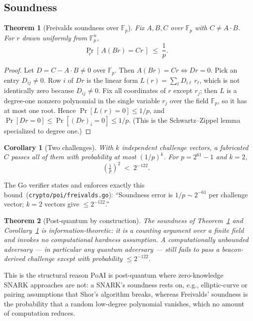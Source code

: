 \documentclass[11pt,a4paper]{article}
\newtheorem{theorem}{Theorem}
\newtheorem{corollary}{Corollary}
\begin{document}
\subsection{Soundness}

\begin{theorem}[Freivalds soundness over $\mathbb{F}_p$]\label{thm:freivalds}
Fix $A, B, C$ over $\mathbb{F}_p$ with $C \neq A \cdot B$. For $r$ drawn uniformly from $\mathbb{F}_p^{n}$,
\[
  \Pr_r\!\left[\, A(Br) = Cr \,\right] \;\le\; \frac{1}{p}.
\]
\end{theorem}

\begin{proof}
Let $D = C - A\cdot B \neq 0$ over $\mathbb{F}_p$. Then $A(Br) = Cr \iff Dr = 0$. Pick an entry $D_{i j} \neq 0$. Row $i$ of $Dr$ is the linear form $L(r) = \sum_{\ell} D_{i\ell}\, r_\ell$, which is not identically zero because $D_{i j} \neq 0$. Fix all coordinates of $r$ except $r_j$; then $L$ is a degree-one nonzero polynomial in the single variable $r_j$ over the field $\mathbb{F}_p$, so it has at most one root. Hence $\Pr[L(r) = 0] \le 1/p$, and $\Pr[Dr = 0] \le \Pr[(Dr)_i = 0] \le 1/p$. (This is the Schwartz--Zippel lemma~\cite{schwartz,zippel} specialized to degree one.)
\end{proof}

\begin{corollary}[Two challenges]\label{cor:two}
With $k$ independent challenge vectors, a fabricated $C$ passes all of them with probability at most $(1/p)^k$. For $p = 2^{61}-1$ and $k = 2$,
\[
  \left(\tfrac{1}{p}\right)^2 \;<\; 2^{-122}.
\]
\end{corollary}

The Go verifier states and enforces exactly this bound~(\texttt{crypto/poi/freivalds.go}): ``Soundness error is $1/p \sim 2^{-61}$ per challenge vector; $k=2$ vectors give $\le 2^{-122}$.''

\begin{theorem}[Post-quantum by construction]\label{thm:pq}
The soundness of Theorem~\ref{thm:freivalds} and Corollary~\ref{cor:two} is information-theoretic: it is a counting argument over a finite field and invokes no computational hardness assumption. A computationally unbounded adversary --- in particular any quantum adversary --- still fails to pass a beacon-derived challenge except with probability $\le 2^{-122}$.
\end{theorem}

This is the structural reason PoAI is post-quantum where zero-knowledge SNARK approaches are not: a SNARK's soundness rests on, e.g., elliptic-curve or pairing assumptions that Shor's algorithm breaks, whereas Freivalds' soundness is the probability that a random low-degree polynomial vanishes, which no amount of computation reduces.
\end{document}
